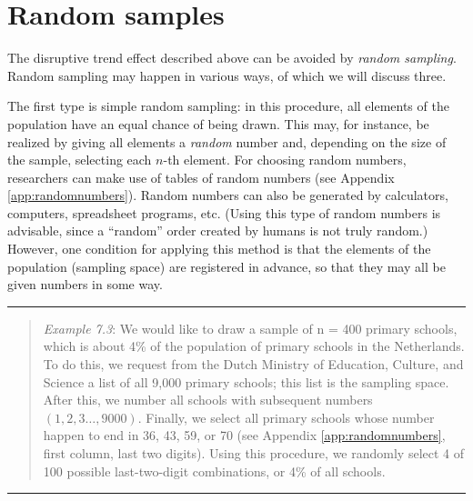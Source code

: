 \documentclass[
]{book}
\begin{document}
\hypertarget{sec:random-samples}{%
\section{Random samples}\label{sec:random-samples}}

The disruptive trend effect described above can be avoided by \emph{random sampling}. Random sampling may happen in various ways, of which we will discuss three.

The first type is simple random sampling: in this procedure, all elements of the population have an equal chance of being drawn. This may, for instance, be realized by giving all elements a \emph{random} number and, depending on the size of the sample, selecting each \(n\)-th element. For choosing random numbers, researchers can make use of tables of random numbers (see Appendix \ref{app:randomnumbers}). Random numbers can also be generated by calculators, computers, spreadsheet programs, etc. (Using this type of random numbers is advisable, since a ``random'' order created by humans is not truly random.) However, one condition for applying this method is that the elements of the population (sampling space) are registered in advance, so that they may all be given numbers in some way.

\begin{center}\rule{0.5\linewidth}{0.5pt}\end{center}

\begin{quote}
\emph{Example 7.3}: We would like to draw a sample of n = 400 primary schools, which is about 4\% of the population of primary schools in the Netherlands. To do this, we request from the Dutch Ministry of Education, Culture, and Science a list of all 9,000 primary schools; this list is the sampling space. After this, we number all schools with subsequent numbers \((1, 2, 3 \ldots, 9000)\). Finally, we select all primary schools whose number happen to end in 36, 43, 59, or 70 (see Appendix \ref{app:randomnumbers}, first column, last two digits). Using this procedure, we randomly select 4 of 100 possible last-two-digit combinations, or 4\% of all schools.
\end{quote}

\begin{center}\rule{0.5\linewidth}{0.5pt}\end{center}
\end{document}
